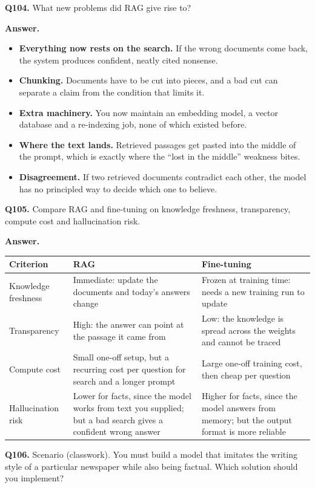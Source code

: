 \documentclass[11pt]{article}
\begin{document}
\medskip
\textbf{Q104.} What new problems did RAG give rise to?

\textbf{Answer.}
\begin{itemize}
  \item \textbf{Everything now rests on the search.} If the wrong documents come back, the system produces confident, neatly cited nonsense.
  \item \textbf{Chunking.} Documents have to be cut into pieces, and a bad cut can separate a claim from the condition that limits it.
  \item \textbf{Extra machinery.} You now maintain an embedding model, a vector database and a re-indexing job, none of which existed before.
  \item \textbf{Where the text lands.} Retrieved passages get pasted into the middle of the prompt, which is exactly where the ``lost in the middle'' weakness bites.
  \item \textbf{Disagreement.} If two retrieved documents contradict each other, the model has no principled way to decide which one to believe.
\end{itemize}

\medskip
\textbf{Q105.} Compare RAG and fine-tuning on knowledge freshness, transparency, compute cost
and hallucination risk.

\textbf{Answer.}

\begin{tabular}{p{}p{}p{}}
\hline
Criterion & RAG & Fine-tuning \\
\hline
Knowledge freshness & Immediate: update the documents and today's answers change & Frozen at training time: needs a new training run to update \\
Transparency & High: the answer can point at the passage it came from & Low: the knowledge is spread across the weights and cannot be traced \\
Compute cost & Small one-off setup, but a recurring cost per question for search and a longer prompt & Large one-off training cost, then cheap per question \\
Hallucination risk & Lower for facts, since the model works from text you supplied; but a bad search gives a confident wrong answer & Higher for facts, since the model answers from memory; but the output format is more reliable \\
\hline
\end{tabular}

\medskip
\textbf{Q106.} Scenario (classwork). You must build a model that imitates the writing style of
a particular newspaper while also being factual. Which solution should you implement?
\end{document}
